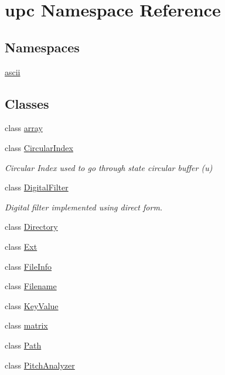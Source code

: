 \hypertarget{namespaceupc}{}\section{upc Namespace Reference}
\label{namespaceupc}
\subsection*{Namespaces}
\begin{DoxyCompactItemize}
\item 
 \hyperlink{namespaceupc_1_1ascii}{ascii}
\end{DoxyCompactItemize}
\subsection*{Classes}
\begin{DoxyCompactItemize}
\item 
class \hyperlink{classupc_1_1array}{array}
\item 
class \hyperlink{classupc_1_1CircularIndex}{Circular\+Index}
\begin{DoxyCompactList}\small\item\em Circular Index used to go through state circular buffer (u) \end{DoxyCompactList}\item 
class \hyperlink{classupc_1_1DigitalFilter}{Digital\+Filter}
\begin{DoxyCompactList}\small\item\em Digital filter implemented using direct form. \end{DoxyCompactList}\item 
class \hyperlink{classupc_1_1Directory}{Directory}
\item 
class \hyperlink{classupc_1_1Ext}{Ext}
\item 
class \hyperlink{classupc_1_1FileInfo}{File\+Info}
\item 
class \hyperlink{classupc_1_1Filename}{Filename}
\item 
class \hyperlink{classupc_1_1KeyValue}{Key\+Value}
\item 
class \hyperlink{classupc_1_1matrix}{matrix}
\item 
class \hyperlink{classupc_1_1Path}{Path}
\item 
class \hyperlink{classupc_1_1PitchAnalyzer}{Pitch\+Analyzer}
\end{DoxyCompactItemize}
